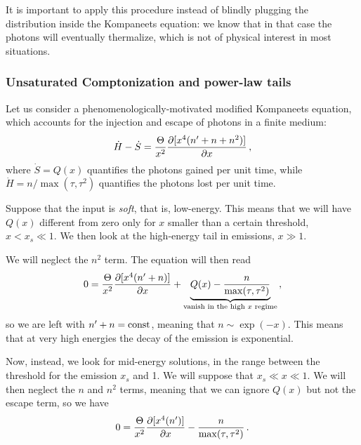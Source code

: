 \documentclass[main.tex]{subfiles}
\begin{document}
It is important to apply this procedure instead of blindly plugging the distribution inside the Kompaneets equation: we know that in that case the photons will eventually thermalize, which is not of physical interest in most situations. 

\subsubsection{Unsaturated Comptonization and power-law tails}

Let us consider a phenomenologically-motivated modified Kompaneets equation, which accounts for the injection and escape of photons in a finite medium: 
%
\begin{align}
\dot{H} - \dot{S} = \frac{\Theta}{x^2} \pdv{[x^{4} (n' + n + n^2)]}{x}
\,,
\end{align}
%
where \(\dot{S} = Q(x)\) quantifies the photons gained per unit time, while \(\dot{H} = n / \max(\tau , \tau^2)\) quantifies the photons lost per unit time.


Suppose that the input is \emph{soft}, that is, low-energy. 
This means that we will have \(Q(x)\) different from zero only for \(x\) smaller than a certain threshold, \(x< x_s \ll 1\). 
We then look at the high-energy tail in emissions, \(x \gg 1\).

We will neglect the \(n^2\) term. The equation  will then read 
%
\begin{align}
0 = \frac{\Theta}{x^2} \pdv{[x^{4}(n' + n)]}{x} + \underbrace{Q(x) - \frac{n}{\max (\tau , \tau^2)}}_{\text{vanish in the high \(x\) regime}}
\,,
\end{align}
%
so we are left with \(n' + n = \text{const}\), meaning that \(n \sim \exp(- x)\). 
This means that at very high energies the decay of the emission is exponential.


Now, instead, we look for mid-energy solutions, in the range between the threshold for the emission \(x_s\) and 1. We will suppose that \(x_s \ll x \ll 1\). 
We will then neglect the \(n\) and \(n^2\) terms, meaning that we can ignore \(Q(x)\) but not the escape term, so we have 
%
\begin{align}
0 = \frac{\Theta}{x^2} \pdv{[x^{4} (n')]}{x} - \frac{n}{\max (\tau , \tau^2)}
\,.
\end{align}
\end{document}
